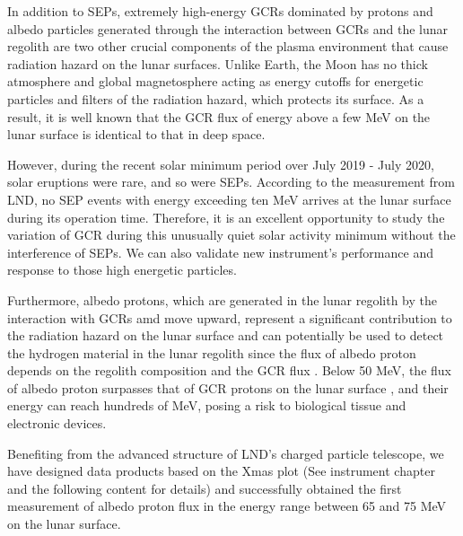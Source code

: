 
In addition to \acp{SEP}, extremely high-energy \acp{GCR} dominated by protons and albedo particles generated through the interaction between \acp{GCR} and the lunar regolith are two other crucial components of the plasma environment that cause radiation hazard on the lunar surfaces.
Unlike Earth, the Moon has no thick atmosphere and global magnetosphere acting as energy cutoffs for energetic particles and filters of the radiation hazard, which protects its surface. As a result, it is well known that the \ac{GCR} flux of energy above a few MeV on the lunar surface is identical to that in deep space.

However, during the recent solar minimum period over July 2019 - July 2020, solar eruptions were rare, and so were \acp{SEP}. According to the measurement from \ac{LND}, no \ac{SEP} events with energy exceeding ten MeV arrives at the lunar surface during its operation time.
Therefore, it is an excellent opportunity to study the variation of \acs{GCR}  during this unusually quiet solar activity minimum \citep{Fu2021ApJS} without the interference of \acp{SEP}. We can also validate new instrument's performance and response to those high energetic particles.    

Furthermore, albedo protons, which are generated in the lunar regolith by the interaction with \acp{GCR} amd move upward, represent a significant contribution to the radiation hazard on the lunar surface and can potentially be used to detect the hydrogen material in the lunar regolith since the flux of albedo proton depends on the regolith composition and the \ac{GCR} flux \citep{Schwadron2016Icarus}.
Below 50 MeV, the flux of albedo proton surpasses that of \ac{GCR} protons on the lunar surface \citep{Dobynde2021JGRE, Wimmer2020SSRv}, and their energy can reach hundreds of MeV, posing a risk to biological tissue and electronic devices.

Benefiting from the advanced structure of \ac{LND}'s charged particle telescope, we have designed data products based on the Xmas plot (See instrument chapter and the following content for details) and successfully obtained the first measurement of albedo proton flux in the energy range between 65 and 75 MeV on the lunar surface.


